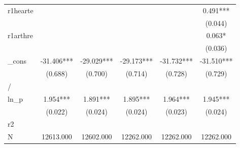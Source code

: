 {\begin{tabular}{l*{5}{c}}
r1hearte        &               &               &               &               &       0.491***\\
                &               &               &               &               &     (0.044)   \\
r1arthre        &               &               &               &               &       0.063*  \\
                &               &               &               &               &     (0.036)   \\
\_cons          &     -31.406***&     -29.029***&     -29.173***&     -31.732***&     -31.510***\\
                &     (0.688)   &     (0.700)   &     (0.714)   &     (0.728)   &     (0.729)   \\
\hline
/               &               &               &               &               &               \\
ln\_p            &       1.954***&       1.891***&       1.895***&       1.964***&       1.945***\\
                &     (0.022)   &     (0.024)   &     (0.024)   &     (0.023)   &     (0.024)   \\
\hline
r2              &               &               &               &               &               \\
N               &   12613.000   &   12602.000   &   12262.000   &   12262.000   &   12262.000   \\
\hline\hline
\end{tabular}
}
